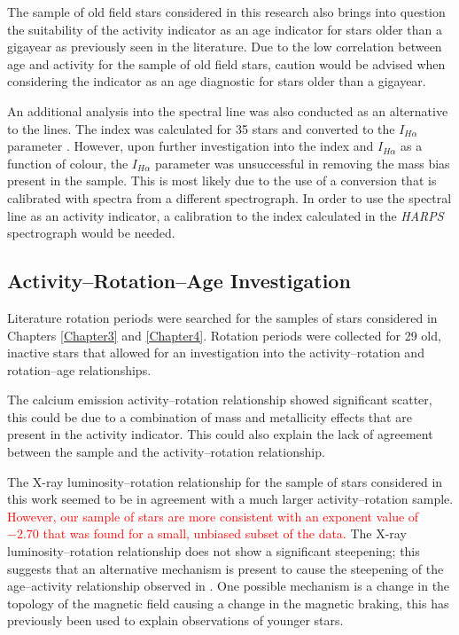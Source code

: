 The sample of old field stars considered in this research also brings into question the suitability of the \Rprime activity indicator as an age indicator for stars older than a gigayear as previously seen in the literature. Due to the low correlation between age and activity for the sample of old field stars, caution would be advised when considering the \Rprime indicator as an age diagnostic for stars older than a gigayear.

An additional analysis into the \Halpha spectral line was also conducted as an alternative to the \caII lines. The \Halpha index was calculated for 35 stars and converted to the $I_{H\alpha}$ parameter \citep{Gomes_da_Silva_etal_2014}. However, upon further investigation into the \Halpha index and $I_{H\alpha}$ as a function of colour, the $I_{H\alpha}$ parameter was unsuccessful in removing the mass bias present in the sample. This is most likely due to the use of a conversion that is calibrated with spectra from a different spectrograph. In order to use the \Halpha spectral line as an activity indicator, a calibration to the \Halpha index calculated in the \textit{HARPS} spectrograph would be needed.

\subsection{Activity--Rotation--Age Investigation}

Literature rotation periods were searched for the samples of stars considered in Chapters \ref{Chapter3} and \ref{Chapter4}. Rotation periods were collected for 29 old, inactive stars that allowed for an investigation into the activity--rotation and rotation--age relationships.

The calcium emission activity--rotation relationship showed significant scatter, this could be due to a combination of mass and metallicity effects that are present in the \Rprime activity indicator. This could also explain the lack of agreement between the sample and the \citet{Mamajek_Hillenbrand_2008} activity--rotation relationship.

The X-ray luminosity--rotation relationship for the sample of stars considered in this work seemed to be in agreement with a much larger activity--rotation sample. \textcolor{red}{However, our sample of stars are more consistent with an exponent value of $-2.70$ that was found for a small, unbiased subset of the \citet{Wright_etal_2011} data.} The X-ray luminosity--rotation relationship does not show a significant steepening; this suggests that an alternative mechanism is present to cause the steepening of the age--activity relationship observed in \citet{Booth_etal_2017}. One possible mechanism is a change in the topology of the magnetic field causing a change in the magnetic braking, this has previously been used to explain observations of younger stars.

